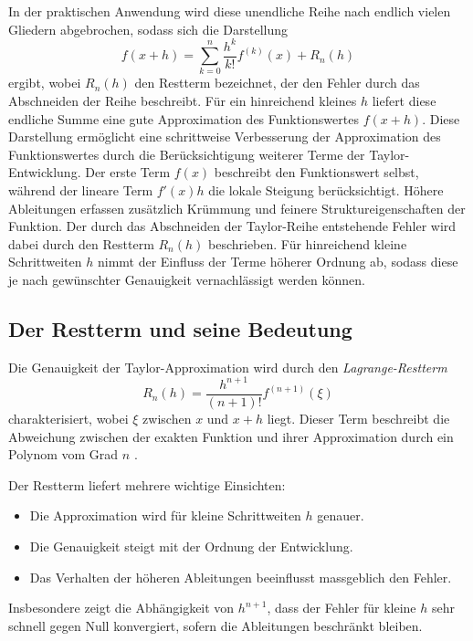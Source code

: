 In der praktischen Anwendung wird diese unendliche Reihe nach endlich vielen Gliedern 
abgebrochen, sodass sich die Darstellung
\begin{equation*}
	f(x+h) = \sum_{k=0}^{n} \frac{h^k}{k!} f^{(k)}(x) + R_n(h)
			\label{step:finiteDifferenz}
\end{equation*}
ergibt, wobei $R_n(h)$ den Restterm bezeichnet, der den Fehler durch das Abschneiden 
der Reihe beschreibt. Für ein hinreichend kleines $h$ liefert diese endliche Summe eine 
gute Approximation des Funktionswertes $f(x+h)$.
Diese Darstellung ermöglicht eine schrittweise Verbesserung der Approximation des Funktionswertes durch die Berücksichtigung weiterer Terme der Taylor-Entwicklung.
Der erste Term $f(x)$ beschreibt den Funktionswert selbst, während der lineare Term 
$f'(x)h$ die lokale Steigung berücksichtigt.
Höhere Ableitungen erfassen zusätzlich 
Krümmung und feinere Struktureigenschaften der Funktion.
Der durch das Abschneiden der Taylor-Reihe entstehende Fehler wird dabei durch den Restterm $R_n(h)$ beschrieben.
Für hinreichend kleine Schrittweiten $h$ nimmt der Einfluss der Terme höherer Ordnung ab, sodass diese je nach gewünschter Genauigkeit vernachlässigt werden können.

\subsection{Der Restterm und seine Bedeutung}

Die Genauigkeit der Taylor-Approximation wird durch den \emph{Lagrange-Restterm}
\begin{equation*}
	R_n(h) = \frac{h^{n+1}}{(n+1)!} f^{(n+1)}(\xi)
\end{equation*}
%
%
charakterisiert, wobei $\xi$ zwischen $x$ und $x+h$ liegt. Dieser Term beschreibt die 
Abweichung zwischen der exakten Funktion und ihrer Approximation durch ein Polynom 
vom Grad $n$ \cite{step:burden2010numerical}.

Der Restterm liefert mehrere wichtige Einsichten:
\begin{itemize}
	\item Die Approximation wird für kleine Schrittweiten $h$ genauer.
	\item Die Genauigkeit steigt mit der Ordnung der Entwicklung.
	\item Das Verhalten der höheren Ableitungen beeinflusst massgeblich den Fehler.
\end{itemize}
Insbesondere zeigt die Abhängigkeit von $h^{n+1}$, dass der Fehler für kleine $h$ 
sehr schnell gegen Null konvergiert, sofern die Ableitungen beschränkt bleiben.

